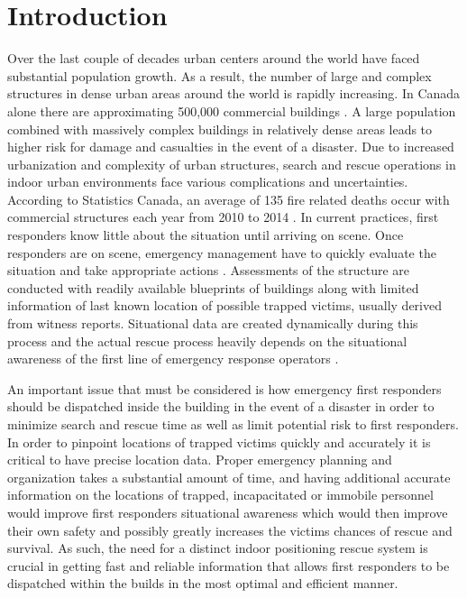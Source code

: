 

\setcounter{section}{0}
\section{Introduction}
\bigskip
Over the last couple of decades urban centers around the world have faced substantial population growth. As a result, the number of large and complex structures in dense urban areas around the world is rapidly increasing. In Canada alone there are approximating 500,000 commercial buildings \cite{R1}. A large population combined with massively complex buildings in relatively dense areas leads to higher risk for damage and casualties in the event of a disaster. Due to increased urbanization and complexity of urban structures, search and rescue operations in indoor urban environments face various complications and uncertainties. According to Statistics Canada, an average of 135 fire related deaths occur with commercial structures each year from 2010 to 2014 \cite{R2}. In current practices, first responders know little about the situation until arriving on scene. Once responders are on scene, emergency management have to quickly evaluate the situation and take appropriate actions \cite{R3}.  Assessments of the structure are conducted with readily available blueprints of buildings along with limited information of last known location of possible trapped victims, usually derived from witness reports. Situational data are created dynamically during this process and the actual rescue process heavily depends on the situational awareness of the first line of emergency response operators \cite{R4}.

\bigskip
An important issue that must be considered is how emergency first responders should be dispatched inside the building in the event of a disaster in order to minimize search and rescue time as well as limit potential risk to first responders. In order to pinpoint locations of trapped victims quickly and accurately it is critical to have precise location data. Proper emergency planning and organization takes a substantial amount of time, and having additional accurate information on the locations of trapped, incapacitated or immobile personnel would improve first responders situational awareness which would then improve their own safety and possibly greatly increases the victims chances of rescue and survival. As such, the need for a distinct indoor positioning rescue system is crucial in getting fast and reliable information that allows first responders to be dispatched within the builds in the most optimal and efficient manner. 

